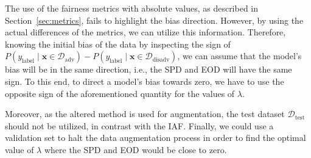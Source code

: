 The use of the fairness metrics with absolute values, as described in Section~\ref{sec:metrics}, fails to highlight the bias direction. However, by using the actual differences of the metrics, we can utilize this information. Therefore, knowing the initial bias of the data by inspecting the sign of $P(y_{\mathrm{label}} \mid \mathbf{x} \in \mathcal{D}_{\mathrm{adv}}) - P(y_{\mathrm{label}} \mid \mathbf{x} \in \mathcal{D}_{\mathrm{disadv}})$, we can assume that the model's bias will be in the same direction, i.e., the SPD and EOD will have the same sign. To this end, to direct a model's bias towards zero, we have to use the opposite sign of the aforementioned quantity for the values of $\lambda$.

Moreover, as the altered method is used for augmentation, the test dataset $\mathcal{D}_{\mathrm{test}}$ should not be utilized, in contrast with the IAF. Finally, we could use a validation set to halt the data augmentation process in order to find the optimal value of $\lambda$ where the SPD and EOD would be close to zero.
